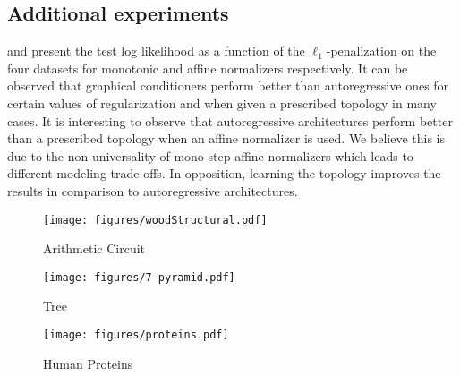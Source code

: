 \subsection{Additional experiments}\label{app:top_dataset_exp}
 and  present the test log likelihood as a function of the $\ell_1$-penalization on the four datasets for monotonic and affine normalizers respectively. It can be observed that graphical conditioners perform better than autoregressive ones for certain values of regularization and when given a prescribed topology in many cases. It is interesting to observe that autoregressive architectures perform better than a prescribed topology when an affine normalizer is used. We believe this is due to the non-universality of mono-step affine normalizers which leads to different modeling trade-offs. In opposition, learning the topology improves the results in comparison to autoregressive architectures.
\begin{figure*}
\centering
\caption{Test log-likelihood as a function of $\ell_1$-penalization for monotonic normalizers. The red horizontal line is the average result when given a prescribed topology, the green horizontal line is the result with an autoregressive conditioner.}
    \label{fig:all_L1}
    \begin{subfigure}[t]{.32\textwidth}
    \texttt{[image: figures/woodStructural.pdf]}
    \caption{Arithmetic Circuit}
    \end{subfigure}
    \begin{subfigure}[t]{.32\textwidth}
    \texttt{[image: figures/7-pyramid.pdf]}
    \caption{Tree}
    \end{subfigure}
    \begin{subfigure}[t]{.32\textwidth}
    \texttt{[image: figures/proteins.pdf]}
    \caption{Human Proteins}
    \end{subfigure}
    \label{fig:app_mono_L1}
\end{figure*}
